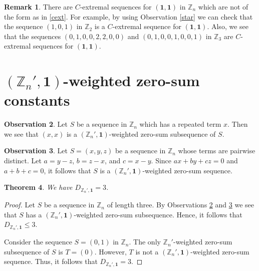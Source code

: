 \documentclass{article}[11pt]
\newtheorem{theorem}{Theorem}[section]
\theoremstyle{definition}
\newtheorem{remark}[theorem]{Remark}
\newtheorem{observation}[theorem]{Observation}
\begin{document}
\begin{remark}\label{c11}
There are $C$-extremal sequences for $(\mathbf 1,\mathbf 1)$ in $\mathbb Z_n$ which are not of the form as in \eqref{cext}. For example, by using Observation \ref{star} we can check that the sequence $(1,0,1)$ in $\mathbb Z_2$ is a $C$-extremal sequence for $(\mathbf 1,\mathbf 1)$. Also, we see that the sequences $(0,1,0,0,2,2,0,0)$ and $(0,1,0,0,1,0,0,1)$ in $\mathbb Z_3$ are $C$-extremal sequences for $(\mathbf 1,\mathbf 1)$.
\end{remark}









\section{$(\mathbb Z_n',\mathbf 1)$-weighted zero-sum constants}\label{sz1}

\begin{observation}\label{2t}
Let $S$ be a sequence in $\mathbb Z_n$ which has a repeated term $x$. Then we see that $(x,x)$ is a $(\mathbb Z_n',\mathbf 1)$-weighted zero-sum subsequence of $S$.
\end{observation}


\begin{observation}\label{3d}
Let $S=(x,y,z)$ be a sequence in $\mathbb Z_n$  whose terms are pairwise distinct. Let $a=y-z$, $b=z-x$, and $c=x-y$. Since $ax+by+cz=0$ and $a+b+c=0$, it follows that $S$ is a $(\mathbb Z_n',\mathbf 1)$-weighted zero-sum sequence.
\end{observation}

\begin{theorem}\label{dnz}
We have $D_{\mathbb Z_n',\mathbf 1}=3$.
\end{theorem}

\begin{proof}
Let $S$ be a sequence in $\mathbb Z_n$ of length three. By Observations \ref{2t} and \ref{3d} we see that $S$ has a $(\mathbb Z_n',\mathbf 1)$-weighted zero-sum subsequence. Hence, it follows that $D_{\mathbb Z_n',\mathbf 1}\leq 3$.

Consider the sequence $S=(0,1)$ in $\mathbb Z_n$. The only $\mathbb Z_n'$-weighted zero-sum subsequence of $S$ is $T=(0)$. However, $T$ is not a $(\mathbb Z_n',\mathbf 1)$-weighted zero-sum sequence. Thus, it follows that $D_{\mathbb Z_n',\mathbf 1}=3$.
\end{proof}
\end{document}
